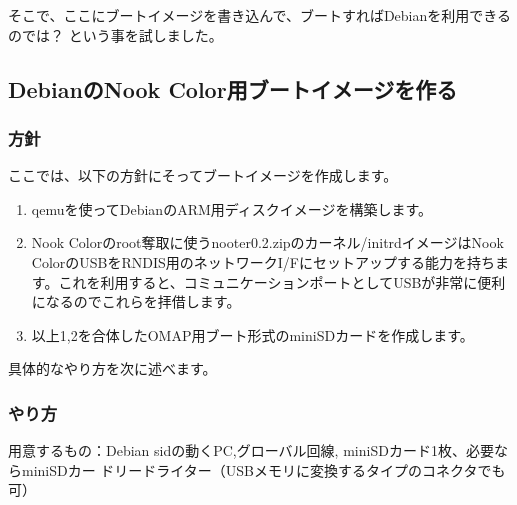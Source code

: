 \documentclass[mingoth,a4paper]{jsarticle}
\begin{document}
そこで、ここにブートイメージを書き込んで、ブートすればDebianを利用できるのでは？
という事を試しました。

\subsection{DebianのNook Color用ブートイメージを作る}

\subsubsection{方針}

ここでは、以下の方針にそってブートイメージを作成します。

\begin{enumerate}
\item qemuを使ってDebianのARM用ディスクイメージを構築します。
\item Nook Colorのroot奪取に使うnooter0.2.zipのカーネル/initrdイメージはNook ColorのUSBをRNDIS用のネットワークI/Fにセットアップする能力を持ちます。これを利用すると、コミュニケーションポートとしてUSBが非常に便利になるのでこれらを拝借します。
\item 以上1,2を合体したOMAP用ブート形式のminiSDカードを作成します。
\end{enumerate}

具体的なやり方を次に述べます。

\subsubsection{やり方}

用意するもの：Debian sidの動くPC,グローバル回線, miniSDカード1枚、必要ならminiSDカー
ドリードライター（USBメモリに変換するタイプのコネクタでも可）
\end{document}
